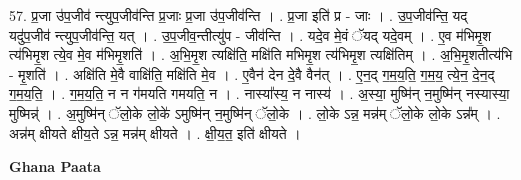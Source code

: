 \documentclass[17pt]{extarticle}
\begin{document}
57. प्र॒जा उ॑प॒जीव॑ न्त्युप॒जीव॑न्ति प्र॒जाः प्र॒जा उ॑प॒जीव॑न्ति । . प्र॒जा इति॑ प्र - जाः । . उ॒प॒जीव॑न्ति॒ यद् यदु॑प॒जीव॑ न्त्युप॒जीव॑न्ति॒ यत् । . उ॒प॒जीव॒न्तीत्यु॑प - जीव॑न्ति । . यदे॒व मे॒वं ॅयद् यदे॒वम् । . ए॒व म॑भिमृ॒श त्य॑भिमृ॒श त्ये॒व मे॒व म॑भिमृ॒शति॑ । . अ॒भि॒मृ॒श त्यक्षि॑ति॒ मक्षि॑ति मभिमृ॒श त्य॑भिमृ॒श त्यक्षि॑तिम् । . अ॒भि॒मृ॒शतीत्य॑भि - मृ॒शति॑ । . अक्षि॑ति मे॒वै वाक्षि॑ति॒ मक्षि॑ति मे॒व । . ए॒वैन॑ देन दे॒वै वैन॑त् । . ए॒न॒द् ग॒म॒य॒ति॒ ग॒म॒य॒ त्ये॒न॒ दे॒न॒द् ग॒म॒य॒ति॒ । . ग॒म॒य॒ति॒ न न ग॑मयति गमयति॒ न । . नास्या᳚स्य॒ न नास्य॑ । . अ॒स्या॒ मुष्मि॑न् न॒मुष्मि॑न् नस्यास्या॒ मुष्मिन्न्॑ । . अ॒मुष्मि॑न् ॅलो॒के लो॒के॑ ऽमुष्मि॑न् न॒मुष्मि॑न् ॅलो॒के । . लो॒के ऽन्न॒ मन्न॑म् ॅलो॒के लो॒के ऽन्न᳚म् । . अन्न॑म् क्षीयते क्षीय॒ते ऽन्न॒ मन्न॑म् क्षीयते । . क्षी॒य॒त॒ इति॑ क्षीयते । \newline

\textbf{Ghana Paata } \newline
\end{document}
